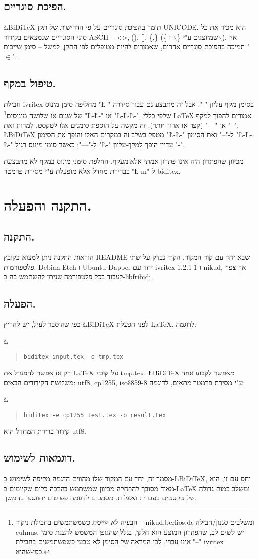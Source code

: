 \documentclass[twocolumn]{article}
\newcommand{\BiDiTeX}{\L{BiDi\TeX{}}}
\newcommand{\bs}{$\backslash$}
\newcommand{\minus}{\L{-}}
\newcommand{\code}[1]{\L{\begin{verse}\texttt{#1}\end{verse}}}
\begin{document}
\subsection{הפיכת סוגריים.}
\BiDiTeX{}
תומך בהפיכת סוגריים על-פי הדרישות של תקן UNICODE. הוא מכיר את כל סוגי הסוגריים שנמצאים בקידוד ASCII -- <>, (), [], \{,\} (שמיוצגים ע"י \{\bs{} ו-\}\bs). אין תמיכה בהפיכת סוגריים אחרים, שאמורים להיות מטופלים לפי התקן, למשל -- סימן שייכות "$\in$".


\subsection{טיפול במקף.}
חבילת ivritex מחליפה סימן מינוס "\minus" בסימן מקף-עליון "-". אבל זה מתבצע גם עבור סידרה של שנים או שלושה מינוסים\footnote{הבעיה \emph{לא קיימת} כשמשתמשים בחבילת ניקוד -- nikud.berlios.de ומשלבים סגנון/חבילה culmus. יש לשים לב, שהפתרון המוצע הוא חלקי, בגלל שהגופן המשמש להצגת סימן "--" אינו עברי, לכן המראה של הסימן לא טבעי כשמשתמשים בחבילת ivritex כפי-שהיא.}
 "\minus\minus"
 או "\minus\minus\minus", שלפי כללי \LaTeX{} אמורים להפוך למקף "--" או "---" (קצר או ארוך יותר). זה מקשה על הוספת סימנים אלו לטקסט. למרות זאת, \BiDiTeX{} מטפל בשלב זה במקרים האלו והופך את הסימון "\minus\minus" ל-"--" ואת הסימון "\minus\minus\minus" ל-"---"; כאשר סימן מינוס רגיל "\minus" עדיין הופך למקף-עליון "-".

מכיוון שהפתרון הזה אינו פתרון אמתי אלא מעקף, החלפת סימני מינוס במקף לא מתבצעת כברירת מחדל אלא מופעלת ע"י מסירת פרמטר "\L{-m}" ל-biditex.

\section{התקנה והפעלה.}
\subsection{התקנה.}
הוראות התקנה ניתן למצוא בקובץ README שבא יחד עם קוד המקור. הקוד נבדק על שתי פלטפורמות: Debian Etch ו-Ubuntu Dapper יחד עם ivritex 1.2.1-1 ו-nikud, אך צפוי לעבוד בכל פלטפורמה שניתן להשתמש בה ב-libfribidi.
\subsection{הפעלה.}

כפי שהוסבר לעיל, יש להריץ \BiDiTeX{} לפני הפעלת \LaTeX{}. לדוגמה:

\code{biditex input.tex -o tmp.tex}

רק אז אפשר להפעיל את \LaTeX{} על קובץ tmp.tex. 
\BiDiTeX{}
מאפשר לקבוע אחד משלושת הקידודים הבאים: utf8, cp1255, iso8859-8 ע"י מסירת פרמטר מתאים, לדוגמה:

\code{biditex -e cp1255 test.tex -o result.tex}

קידוד ברירת המחדל הוא utf8.
\subsection{דוגמאות לשימוש.}
מסמך זה, יחד עם המקור שלו מהווים הדגמה מקיפה לשימוש ב-\BiDiTeX, יחס עם זו, הוא מאוד מסובך להתחלה מכיוון שמשתמש בהרבה כלים שקיימים ב-\LaTeX{} ומשלב כמות גדולה של טקסטים בעברית ואנגלית. מסמכים לדגומה פשוטים יתווספו בהמשך.
\end{document}
